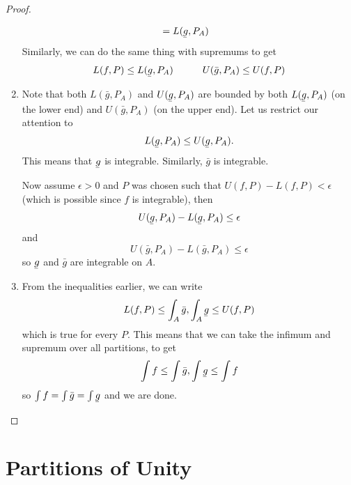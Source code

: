 \documentclass{article}
\newcommand{\ubar}[1]{\underaccent{\bar}{#1}}
\begin{document}
\begin{proof}
\begin{enumerate}
\begin{align}
                         & = L(\ubar{g},P_A)
              \end{align}
              Similarly, we can do the same thing with supremums to get
              \begin{equation}
                  L(f,P) \le L(\ubar{g}, P_A) \quad\quad\quad U(\bar{g}, P_A) \le U(f,P)
              \end{equation}
              \item Note that both $L(\bar{g},P_A)$ and $U(\ubar{g},P_A)$ are bounded by both $L(\ubar{g},P_A)$ (on the lower end) and $U(\bar{g},P_A)$ (on the upper end). Let us restrict our attention to
              \begin{equation}
                  L(\ubar{g}, P_A) \le U(\ubar{g}, P_A).
              \end{equation}
              This means that $\ubar{g}$ is integrable. Similarly, $\bar{g}$ is integrable.

              Now assume $\epsilon > 0$ and $P$ was chosen such that $U(f,P)-L(f,P) < \epsilon$ (which is possible since $f$ is integrable), then
              \begin{equation}
                  U(\ubar{g}, P_A) - L(\ubar{g}, P_A) \le \epsilon
              \end{equation}
              and 
              \begin{equation}
                    U(\bar{g}, P_A) - L(\bar{g}, P_A) \le \epsilon
              \end{equation}
              so $\ubar{g}$ and $\bar{g}$ are integrable on $A$.
              \item From the inequalities earlier, we can write  
              \begin{equation}
                  L(f,P) \le \int_A \bar{g}, \int_A \ubar{g} \le U(f,P)
              \end{equation}
              which is true for every $P$. This means that we can take the infimum and supremum over all partitions, to get
              \begin{equation}
                  \int f \le \int \bar{g}, \int \ubar{g} \le \int f
              \end{equation}
              so $\int f = \int \bar{g} = \int \ubar{g}$ and we are done.
    \end{enumerate}
\end{proof}
\section{Partitions of Unity}
\end{document}
